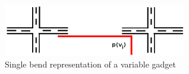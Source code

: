 \begin{figure}[htb]	
\center%
\includegraphics[width=8cm]{./img/gadgetVariavel2.png}
\caption{Single bend representation of a variable gadget}
\label{fig:gadgetVariavel}
\end{figure}